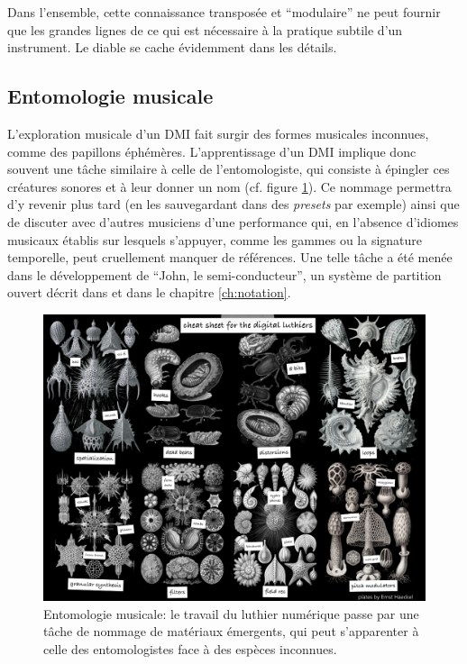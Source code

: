 \noindent Dans l'ensemble, cette connaissance transposée et ``modulaire'' ne peut fournir que les grandes lignes de ce qui est nécessaire à la pratique subtile d'un instrument. Le diable se cache évidemment dans les détails.

\subsection{Entomologie musicale}
\label{sec:ephemeral:vessels}

\noindent L'exploration musicale d'un \gls{DMI} fait surgir des formes musicales inconnues, comme des papillons éphémères. L'apprentissage d'un \gls{DMI} implique donc souvent une tâche similaire à celle de l'entomologiste, qui consiste à épingler ces créatures sonores et à leur donner un nom (cf. figure \ref{fig:ephemeral:entomologie}). Ce nommage permettra d'y revenir plus tard (en les sauvegardant dans des \textit{presets} par exemple) ainsi que de discuter avec d'autres musiciens d'une performance qui, en l'absence d'idiomes musicaux établis sur lesquels s'appuyer, comme les gammes ou la signature temporelle, peut cruellement manquer de références. Une telle tâche a été menée dans le développement de ``John, le semi-conducteur'', un système de partition ouvert décrit dans \cite{goudard_john_2018} et dans le chapitre \ref{ch:notation}.\\
\begin{figure}[!htbp]
	\captionsetup{format=plain}%
	\includegraphics[width=\textwidth]{gfx/02_ephemeral/Bestiaire.png}
	\caption[Entomologie musicale]{Entomologie musicale: le travail du luthier numérique passe par une tâche de nommage de matériaux émergents, qui peut s'apparenter à celle des entomologistes face à des espèces inconnues.}
	\label{fig:ephemeral:entomologie}
\end{figure}

